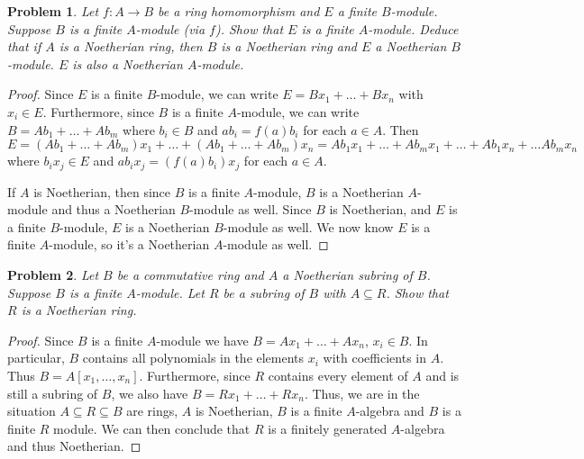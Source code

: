 \documentclass{article}
\newtheorem{problem}{Problem}
\begin{document}
\begin{problem}
Let $f : A \to B$ be a ring homomorphism and $E$ a finite $B$-module. Suppose $B$ is a finite $A$-module (via $f$). Show that $E$ is a finite $A$-module. Deduce that if $A$ is a Noetherian ring, then $B$ is a Noetherian ring and $E$ a Noetherian $B$-module. $E$ is also a Noetherian $A$-module.
\end{problem}
\begin{proof}
Since $E$ is a finite $B$-module, we can write $E = Bx_1 + \dots + Bx_n$ with $x_i \in E$. Furthermore, since $B$ is a finite $A$-module, we can write $B = Ab_1 + \dots + Ab_m$ where $b_i \in B$ and $ab_i = f(a)b_i$ for each $a \in A$. Then
\[
E = (Ab_1 + \dots + Ab_m)x_1 + \dots + (Ab_1 + \dots + Ab_m)x_n = Ab_1x_1 + \dots + Ab_mx_1 + \dots + Ab_1x_n + \dots Ab_mx_n
\]
where $b_ix_j \in E$ and $ab_ix_j = (f(a)b_i)x_j$ for each $a \in A$.

If $A$ is Noetherian, then since $B$ is a finite $A$-module, $B$ is a Noetherian $A$-module and thus a Noetherian $B$-module as well. Since $B$ is Noetherian, and $E$ is a finite $B$-module, $E$ is a Noetherian $B$-module as well. We now know $E$ is a finite $A$-module, so it's a Noetherian $A$-module as well.
\end{proof}

\begin{problem}
Let $B$ be a commutative ring and $A$ a Noetherian subring of $B$. Suppose $B$ is a finite $A$-module. Let $R$ be a subring of $B$ with $A \subseteq R$. Show that $R$ is a Noetherian ring.
\end{problem}
\begin{proof}
Since $B$ is a finite $A$-module we have $B = Ax_1 + \dots + Ax_n$, $x_i \in B$. In particular, $B$ contains all polynomials in the elements $x_i$ with coefficients in $A$. Thus $B = A[x_1, \dots , x_n]$. Furthermore, since $R$ contains every element of $A$ and is still a subring of $B$, we also have $B = Rx_1 + \dots + Rx_n$. Thus, we are in the situation $A \subseteq R \subseteq B$ are rings, $A$ is Noetherian, $B$ is a finite $A$-algebra and $B$ is a finite $R$ module. We can then conclude that $R$ is a finitely generated $A$-algebra and thus Noetherian.
\end{proof}
\end{document}
